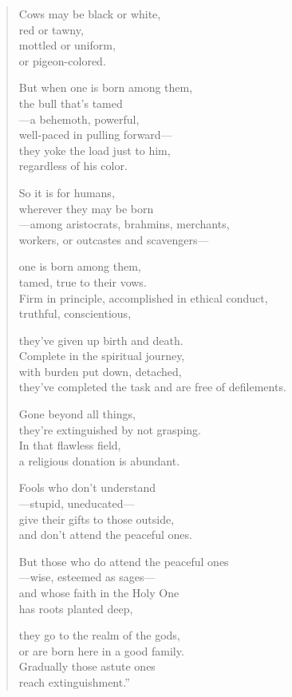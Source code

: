 \documentclass[12pt,openany]{book}%
\begin{document}
\begin{verse}%
Cows may be black or white, \\
red or tawny, \\
mottled or uniform, \\
or pigeon-colored. 

But when one is born among them, \\
the bull that’s tamed \\
—a behemoth, powerful, \\
well-paced in pulling forward—\\
they yoke the load just to him, \\
regardless of his color. 

So it is for humans, \\
wherever they may be born \\
—among aristocrats, brahmins, merchants, \\
workers, or outcastes and scavengers—

one is born among them, \\
tamed, true to their vows. \\
Firm in principle, accomplished in ethical conduct, \\
truthful, conscientious, 

they’ve given up birth and death. \\
Complete in the spiritual journey, \\
with burden put down, detached, \\
they’ve completed the task and are free of defilements. 

Gone beyond all things, \\
they’re extinguished by not grasping. \\
In that flawless field, \\
a religious donation is abundant. 

Fools who don’t understand \\
—stupid, uneducated—\\
give their gifts to those outside, \\
and don’t attend the peaceful ones. 

But those who do attend the peaceful ones \\
—wise, esteemed as sages—\\
and whose faith in the Holy One \\
has roots planted deep, 

they go to the realm of the gods, \\
or are born here in a good family. \\
Gradually those astute ones \\
reach extinguishment.” 

%
\end{verse}
\end{document}

